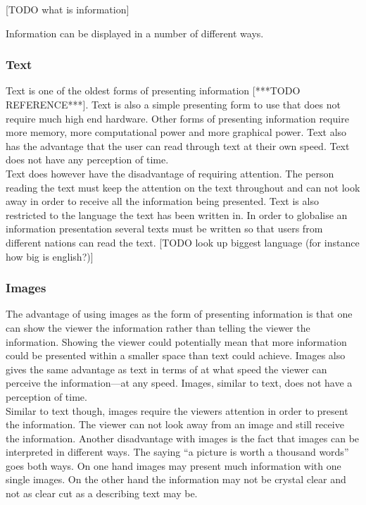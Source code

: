 [TODO what is information]

Information can be displayed in a number of different ways.

\subsubsection{Text}
Text is one of the oldest forms of presenting information [***TODO REFERENCE***]. Text is also a simple presenting form to use that does not require much high end hardware. Other forms of presenting information require more memory, more computational power and more graphical power. Text also has the advantage that the user can read through text at their own speed. Text does not have any perception of time.\\

Text does however have the disadvantage of requiring attention. The person reading the text must keep the attention on the text throughout and can not look away in order to receive all the information being presented. Text is also restricted to the language the text has been written in. In order to globalise an information presentation several texts must be written so that users from different nations can read the text. [TODO look up biggest language (for instance how big is english?)]

\subsubsection{Images}
The advantage of using images as the form of presenting information is that one can show the viewer the information rather than telling the viewer the information. Showing the viewer could potentially mean that more information could be presented within a smaller space than text could achieve. Images also gives the same advantage as text in terms of at what speed the viewer can perceive the information---at any speed. Images, similar to text, does not have a perception of time.\\

Similar to text though, images require the viewers attention in order to present the information. The viewer can not look away from an image and still receive the information. Another disadvantage with images is the fact that images can be interpreted in different ways. The saying ``a picture is worth a thousand words'' goes both ways. On one hand images may present much information with one single images. On the other hand the information may not be crystal clear and not as clear cut as a describing text may be.

